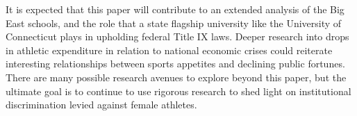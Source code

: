 \documentclass[11pt]{article}
\begin{document}
It is expected that this paper will contribute to an extended analysis of the Big East schools, and the role that a state flagship university like the University of Connecticut plays in upholding federal Title IX laws. Deeper research into drops in athletic expenditure in relation to national economic crises could reiterate interesting relationships between sports appetites and declining public fortunes. There are many possible research avenues to explore beyond this paper, but the ultimate goal is to continue to use rigorous research to shed light on institutional discrimination levied against female athletes.



\end{document}
